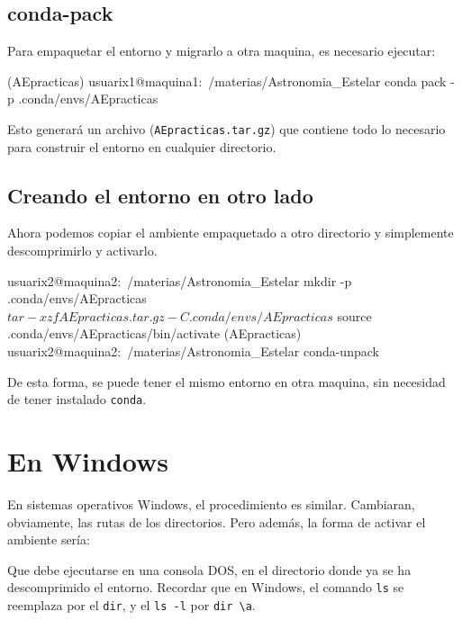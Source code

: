 \documentclass[a4paper, 12pt]{article}
\begin{document}
\subsection{conda-pack}
Para empaquetar el entorno y migrarlo a otra maquina, es necesario ejecutar:
%
\begin{tcolorbox}
\begin{code}
(AEpracticas) usuarix1@maquina1:~/materias/Astronomia_Estelar$ 
$ conda pack -p .conda/envs/AEpracticas
\end{code}
\end{tcolorbox}

Esto generará un archivo (\verb|AEpracticas.tar.gz|) que contiene todo lo necesario para construir el entorno en cualquier directorio.

\subsection{Creando el entorno en otro lado}
Ahora podemos copiar el ambiente empaquetado a otro directorio y
simplemente descomprimirlo y activarlo. 

\begin{tcolorbox}
\begin{code}
usuarix2@maquina2:~/materias/Astronomia_Estelar$
$ mkdir -p .conda/envs/AEpracticas 
$ tar -xzf AEpracticas.tar.gz -C .conda/envs/AEpracticas

$ source .conda/envs/AEpracticas/bin/activate
(AEpracticas) usuarix2@maquina2:~/materias/Astronomia_Estelar$ 

$ conda-unpack
\end{code}
\end{tcolorbox}

De esta forma, se puede tener el mismo entorno en otra maquina, sin necesidad de tener instalado \verb|conda|.

\section{En Windows}
En sistemas operativos Windows, el procedimiento es similar. Cambiaran, obviamente, las rutas de los directorios. Pero además,
la forma de activar el ambiente sería:
\begin{tcolorbox}
\end{tcolorbox}

Que debe ejecutarse en una consola {\sc DOS}, en el directorio donde ya se ha descomprimido el entorno.
Recordar que en Windows, el comando \verb|ls| se reemplaza por el \verb|dir|, y el \verb|ls -l| por \verb|dir \a|.
\end{document}
